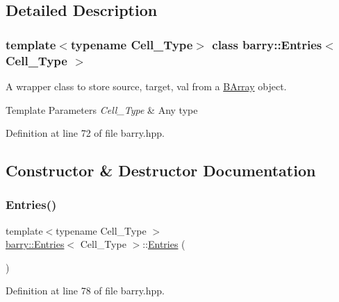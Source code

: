 \subsection{Detailed Description}
\subsubsection*{template$<$typename Cell\+\_\+\+Type$>$\newline
class barry\+::\+Entries$<$ Cell\+\_\+\+Type $>$}

A wrapper class to store {\ttfamily source}, {\ttfamily target}, {\ttfamily val} from a {\ttfamily \hyperlink{classbarry_1_1_b_array}{B\+Array}} object. 


\begin{DoxyTemplParams}{Template Parameters}
{\em Cell\+\_\+\+Type} & Any type \\
\hline
\end{DoxyTemplParams}


Definition at line 72 of file barry.\+hpp.



\subsection{Constructor \& Destructor Documentation}
\mbox{\label{classbarry_1_1_entries_aa51d37ad8e5f441fd64c954dfab9ad04}} 
\subsubsection{\texorpdfstring{Entries()}{Entries()}\hspace{0.1cm}{\footnotesize\ttfamily [1/2]}}
{\footnotesize\ttfamily template$<$typename Cell\+\_\+\+Type $>$ \\
\hyperlink{classbarry_1_1_entries}{barry\+::\+Entries}$<$ Cell\+\_\+\+Type $>$\+::\hyperlink{classbarry_1_1_entries}{Entries} (\begin{DoxyParamCaption}{ }\end{DoxyParamCaption})\hspace{0.3cm}{\ttfamily [inline]}}



Definition at line 78 of file barry.\+hpp.

\mbox{\label{classbarry_1_1_entries_a22dda1d0afd4fbe4b658e55ca1b61f16}} 
